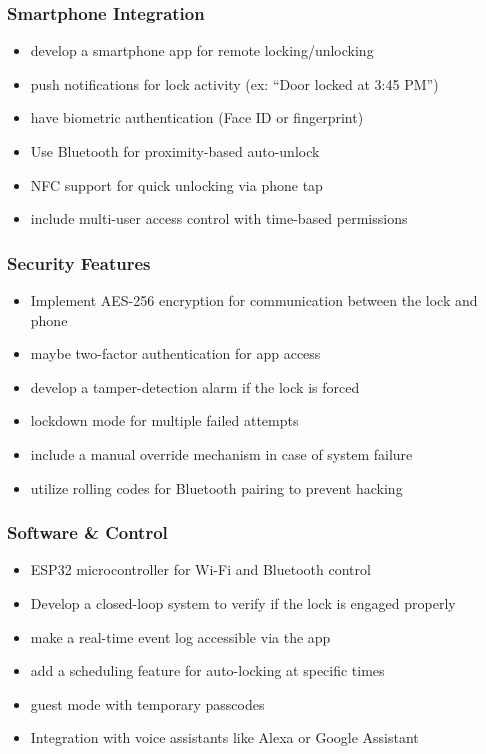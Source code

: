 \subsubsection*{Smartphone Integration}
\begin{itemize}
    \item develop a smartphone app for remote locking/unlocking
    \item push notifications for lock activity (ex: ``Door locked at 3:45 PM'')
    \item have biometric authentication (Face ID or fingerprint)
    \item Use Bluetooth for proximity-based auto-unlock
    \item NFC support for quick unlocking via phone tap
    \item include multi-user access control with time-based permissions
\end{itemize}

\subsubsection*{Security Features}
\begin{itemize}
    \item Implement AES-256 encryption for communication between the lock and phone
    \item maybe two-factor authentication for app access
    \item develop a tamper-detection alarm if the lock is forced
    \item lockdown mode for multiple failed attempts
    \item include a manual override mechanism in case of system failure
    \item utilize rolling codes for Bluetooth pairing to prevent hacking
\end{itemize}

\subsubsection*{Software \& Control}
\begin{itemize}
    \item ESP32 microcontroller for Wi-Fi and Bluetooth control
    \item Develop a closed-loop system to verify if the lock is engaged properly
    \item make a real-time event log accessible via the app
    \item add a scheduling feature for auto-locking at specific times
    \item guest mode with temporary passcodes
    \item Integration with voice assistants like Alexa or Google Assistant
\end{itemize}

